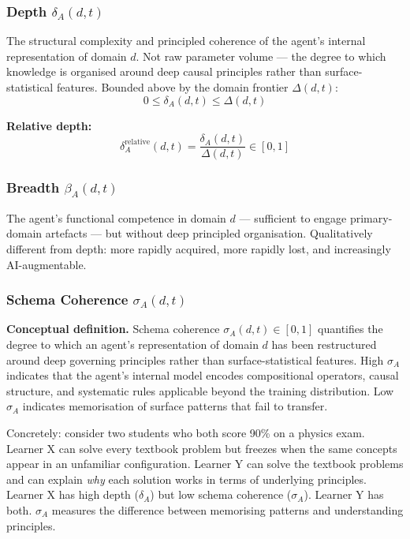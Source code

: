 \documentclass[10pt]{article}
\begin{document}
\subsubsection{Depth \texorpdfstring{$\delta_A(d,t)$}{delta\_A(d,t)}}\label{sec:depth}

The structural complexity and principled coherence of the agent's
internal representation of domain $d$. Not raw parameter volume ---
the degree to which knowledge is organised around deep causal principles
rather than surface-statistical features. Bounded above by the domain
frontier $\Delta(d,t)$:
\begin{equation}\label{eq:depth-bounds}
0 \leq \delta_A(d,t) \leq \Delta(d,t)
\end{equation}

\textbf{Relative depth:}
\begin{equation}\label{eq:relative-depth}
\delta_A^{\text{relative}}(d,t) = \frac{\delta_A(d,t)}{\Delta(d,t)} \in [0,1]
\end{equation}

\subsubsection{Breadth \texorpdfstring{$\beta_A(d,t)$}{beta\_A(d,t)}}\label{sec:breadth}

The agent's functional competence in domain $d$ --- sufficient to
engage primary-domain artefacts --- but without deep principled
organisation. Qualitatively different from depth: more rapidly acquired,
more rapidly lost, and increasingly AI-augmentable.

\subsubsection{Schema Coherence \texorpdfstring{$\sigma_A(d,t)$}{sigma\_A(d,t)}}\label{sec:schema-coherence}

\textbf{Conceptual definition.} Schema coherence $\sigma_A(d,t) \in [0,1]$
quantifies the degree to which an agent's representation of domain $d$
has been restructured around deep governing principles rather than
surface-statistical features. High $\sigma_A$ indicates that the agent's
internal model encodes compositional operators, causal structure, and
systematic rules applicable beyond the training distribution. Low
$\sigma_A$ indicates memorisation of surface patterns that fail to
transfer.

Concretely: consider two students who both score 90\% on a physics exam. Learner X can solve every textbook problem but freezes when the same concepts appear in an unfamiliar configuration. Learner Y can solve the textbook problems and can explain \emph{why} each solution works in terms of underlying principles. Learner X has high depth ($\delta_A$) but low schema coherence ($\sigma_A$). Learner Y has both. $\sigma_A$ measures the difference between memorising patterns and understanding principles.
\end{document}
